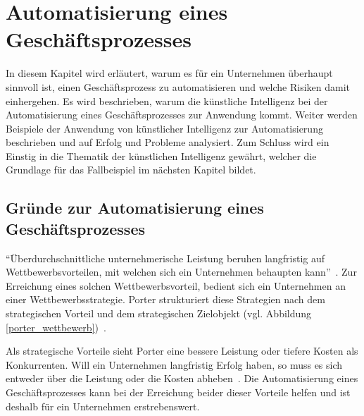 \section{Automatisierung eines Geschäftsprozesses}
\label{chap:automation}

In diesem Kapitel wird erläutert, warum es für ein Unternehmen überhaupt sinnvoll ist, einen Geschäftsprozess zu automatisieren und welche Risiken damit einhergehen. Es wird beschrieben, warum die künstliche Intelligenz bei der Automatisierung eines Geschäftsprozesses zur Anwendung kommt. Weiter werden Beispiele der Anwendung von künstlicher Intelligenz zur Automatisierung beschrieben und auf Erfolg und Probleme analysiert. Zum Schluss wird ein Einstig in die Thematik der künstlichen Intelligenz gewährt, welcher die Grundlage für das Fallbeispiel im nächsten Kapitel bildet.


\subsection{Gründe zur Automatisierung eines Geschäftsprozesses}

\enquote{Überdurchschnittliche unternehmerische Leistung beruhen langfristig auf Wettbewerbsvorteilen, mit welchen sich ein Unternehmen behaupten kann}~\autocite[104]{Capaul2010}. Zur Erreichung eines solchen Wettbewerbsvorteil, bedient sich ein Unternehmen an einer Wettbewerbsstrategie. Porter strukturiert diese Strategien nach dem strategischen Vorteil und dem strategischen Zielobjekt (vgl. Abbildung \ref{porter_wettbewerb})~\autocite{Capaul2010}. 

Als strategische Vorteile sieht Porter eine bessere Leistung oder tiefere Kosten als Konkurrenten. Will ein Unternehmen langfristig Erfolg haben, so muss es sich entweder über die Leistung oder die Kosten abheben~\autocite{Capaul2010}. Die Automatisierung eines Geschäftsprozesses kann bei der Erreichung beider dieser Vorteile helfen und ist deshalb für ein Unternehmen erstrebenswert. 

